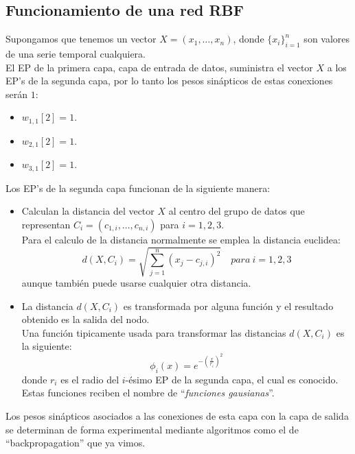 %
%

\subsection{Funcionamiento de una red RBF}

Supongamos que tenemos un vector $X=(x_1,\dots,x_n)$, donde $\{x_i\}_{i=1}^n$
son valores de una serie temporal cualquiera.\\

El EP de la primera capa, capa de entrada de datos, suministra el vector $X$ a
los EP's de la segunda capa, por lo tanto los pesos sin\'apticos de estas
conexiones ser\'an $1$:
\begin{itemize}
\item $w_{1,1}[2]=1$.
\item $w_{2,1}[2]=1$.
\item $w_{3,1}[2]=1$.
\end{itemize}
%
\newpage
%
Los EP's de la segunda capa funcionan de la siguiente manera:
\begin{itemize}
\item Calculan la distancia del vector $X$ al centro del grupo de datos que
representan $C_i=(c_{1,i},\dots,c_{n,i})$ para $i=1,2,3$.\\

Para el calculo de la distancia normalmente se emplea la distancia euclidea:
\begin{displaymath}
d(X,C_i) =\sqrt{\sum_{j=1}^n(x_j-c_{j,i})^2}\quad para\ i=1,2,3
\end{displaymath}
aunque tambi\'en puede usarse cualquier otra distancia.
\item La distancia $d(X,C_i)$ es transformada por alguna funci\'on y el
resultado obtenido es la salida del nodo.\\

Una funci\'on tipicamente usada para transformar las distancias $d(X,C_i)$ es
la siguiente:
\begin{displaymath}
\phi_i(x) = e^{-(\frac{x}{r_i})^2}
\end{displaymath}
donde $r_i$ es el radio del $i$-\'esimo EP de la segunda capa, el cual es
conocido. Estas funciones reciben el nombre de ``\emph{funciones gausianas}''.
\end{itemize}
Los pesos sin\'apticos asociados a las conexiones de esta capa con la capa de
salida se determinan de forma experimental mediante algoritmos como el de 
``backpropagation'' que ya vimos.\\ \\
